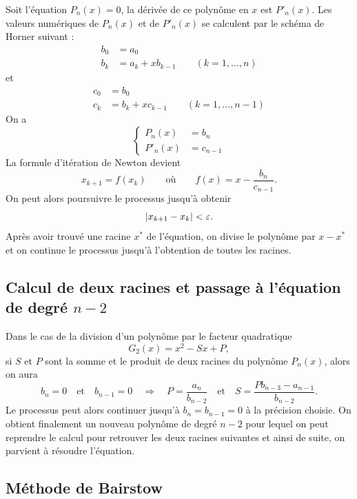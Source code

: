 Soit l'équation $P_n(x) = 0$, la dérivée de ce polynôme en $x$ est $P'_n(x)$.
Les valeurs numériques de $P_n(x)$ et de $P'_n(x)$ se calculent par le schéma
de Horner suivant :
\[
  \begin{aligned}
    b_0 &= a_0\\
    b_k &= a_k + xb_{k-1} \qquad (k = 1, \dots, n)
  \end{aligned}
\]
et
\[
  \begin{aligned}
    c_0 &= b_0\\
    c_k &= b_k + xc_{k-1} \qquad (k = 1, \dots, n-1)
  \end{aligned}
\]
On a
\[
  \left\{
  \begin{aligned}
    P_n(x) &= b_n\\
    P'_n(x) &= c_{n-1}
  \end{aligned}
  \right.
\]
La formule d'itération de Newton devient
\[
  x_{k+1} = f(x_k) \qquad\text{où}\qquad f(x) = x - \frac{b_n}{c_{n-1}} .
\]
On peut alors poursuivre le processus jusqu'à obtenir
\[
  \left|x_{k+1} - x_k\right| < \varepsilon .
\]
Après avoir trouvé une racine $x^*$ de l'équation, on divise le polynôme par
$x - x^*$ et on continue le processus jusqu'à l'obtention de toutes les
racines.

\subsection{Calcul de deux racines et passage à l'équation de degré
\texorpdfstring{$n-2$}{n-2}}

Dans le cas de la division d'un polynôme par le facteur quadratique
\[
  G_2(x) = x^2 - Sx + P ,
\]
si $S$ et $P$ sont la somme et le produit de deux racines du polynôme
$P_n(x)$, alors on aura
\[
  b_n = 0 \quad\text{et}\quad b_{n-1} = 0
  \quad\Longrightarrow\quad
  P = \frac{a_n}{b_{n-2}} \quad\text{et}\quad
  S = \frac{Pb_{n-3} - a_{n-1}}{b_{n-2}} .
\]
Le processus peut alors continuer jusqu'à $b_n = b_{n-1} = 0$ à la précision
choisie. On obtient finalement un nouveau polynôme de degré $n-2$ pour lequel
on peut reprendre le calcul pour retrouver les deux racines suivantes et ainsi
de suite, on parvient à résoudre l'équation.

\subsection{Méthode de Bairstow}

